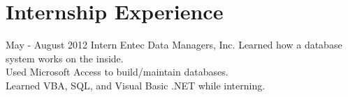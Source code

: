 \documentclass[]{resume-class}
\begin{document}
\section{Internship Experience}

\begin{entrylist}
  \entry
    {May - August 2012}
    {Intern}
    {Entec Data Managers, Inc.}
    {Learned how a database system works on the inside.\\
    Used Microsoft Access to build/maintain databases.\\
    Learned VBA, SQL, and Visual Basic .NET while interning.}
\end{entrylist}
\end{document}
